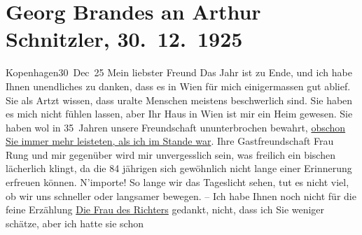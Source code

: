 

               \section[Georg Brandes an Arthur Schnitzler, 30. 12. 1925]{ Georg Brandes an Arthur Schnitzler, 30. 12. 1925}\nopagebreak{}\rehead{ }\begin{ledgroupsized}[t]{13cm}\normalsize\beginnumbering{} \toendnotes[C]{\smallbreak\pagebreak[2]} 
\pstart
           \raggedleft{}{\pb}Kopenhagen30 Dec 25\pend
           \pstart{}Mein liebster Freund\pend\pstart
           Das Jahr ist zu Ende, und ich habe Ihnen unendliches zu danken, dass es in Wien für mich einigermassen gut ablief. Sie als
                    Artzt wissen, dass uralte Menschen meistens beschwerlich sind. Sie haben es mich
                    nicht fühlen lassen, aber Ihr Haus in Wien ist
                    mir ein Heim gewesen. Sie haben wol in 35 Jahren unsere Freundschaft
                    ununterbrochen bewahrt, \uline{obschon Sie immer mehr
                        leisteten, als ich im Stande war}. Ihre Gastfreundschaft Frau Rung und mir {\pb}gegenüber wird mir
                    unvergesslich sein, was freilich ein bischen lächerlich klingt, da die 84
                    jährigen sich gewöhnlich nicht lange einer Erinnerung erfreuen können.\pend
           \pstart
           N’importe! So lange wir das Tageslicht sehen, tut es nicht viel, ob wir uns
                    schneller oder langsamer bewegen. – Ich habe Ihnen noch nicht für die feine
                    Erzählung \uline{Die Frau des Richters} gedankt, nicht, dass ich Sie weniger schätze, aber ich hatte sie schon

\end{ledgroupsized}
